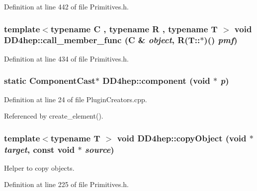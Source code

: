 Definition at line 442 of file Primitives.h.\hypertarget{namespace_d_d4hep_ac90890d501a808e24d23764f30b12d4a}{
\subsubsection[{call\_\-member\_\-func}]{\setlength{\rightskip}{0pt plus 5cm}template$<$typename C , typename R , typename T $>$ void DD4hep::call\_\-member\_\-func (C \& {\em object}, \/  R(T::$\ast$)() {\em pmf})}}
\label{namespace_d_d4hep_ac90890d501a808e24d23764f30b12d4a}


Definition at line 434 of file Primitives.h.\hypertarget{namespace_d_d4hep_a9bd7c6fd6580a172a3d0a09eb3ea4793}{
\subsubsection[{component}]{\setlength{\rightskip}{0pt plus 5cm}static {\bf ComponentCast}$\ast$ DD4hep::component (void $\ast$ {\em p})}}
\label{namespace_d_d4hep_a9bd7c6fd6580a172a3d0a09eb3ea4793}


Definition at line 24 of file PluginCreators.cpp.

Referenced by create\_\-element().\hypertarget{namespace_d_d4hep_a765166684fc83ac1fdd00ad6e92e82b9}{
\subsubsection[{copyObject}]{\setlength{\rightskip}{0pt plus 5cm}template$<$typename T $>$ void DD4hep::copyObject (void $\ast$ {\em target}, \/  const void $\ast$ {\em source})}}
\label{namespace_d_d4hep_a765166684fc83ac1fdd00ad6e92e82b9}


Helper to copy objects. 

Definition at line 225 of file Primitives.h.

